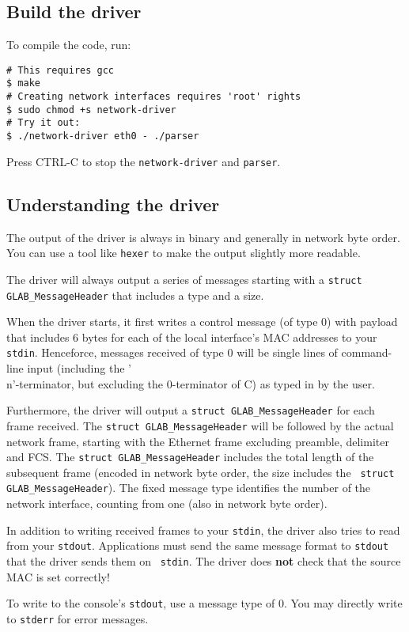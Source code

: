 \subsection{Build the driver}

To compile the code, run:
\begin{verbatim}
# This requires gcc
$ make
# Creating network interfaces requires 'root' rights
$ sudo chmod +s network-driver
# Try it out:
$ ./network-driver eth0 - ./parser
\end{verbatim}
Press CTRL-C to stop the {\tt network-driver} and {\tt parser}.


\subsection{Understanding the driver}

The output of the driver is always in binary and generally in network
byte order.  You can use a tool like {\tt hexer} to make the output
slightly more readable.

The driver will always output a series of messages starting with
a {\tt struct GLAB\_MessageHeader} that includes a type and a size.

When the driver starts, it first writes a control message (of type 0)
with payload that includes 6 bytes for each of the local interface's
MAC addresses to your {\tt stdin}.  Henceforce, messages received
of type 0 will be single lines of command-line input (including the
'\\n'-terminator, but excluding the 0-terminator of C) as typed in
by the user.

Furthermore, the driver will output a {\tt struct GLAB\_MessageHeader}
for each frame received.  The {\tt struct GLAB\_MessageHeader} will be
followed by the actual network frame, starting with the Ethernet frame
excluding preamble, delimiter and FCS.  The {\tt struct
  GLAB\_MessageHeader} includes the total length of the subsequent
frame (encoded in network byte order, the size includes the {\tt
  struct GLAB\_MessageHeader}).  The fixed message type identifies the
number of the network interface, counting from one (also in network
byte order).

In addition to writing received frames to your {\tt stdin}, the driver
also tries to read from your {\tt stdout}.  Applications must send the
same message format to {\tt stdout} that the driver sends them on {\tt
  stdin}.  The driver does {\bf not} check that the source MAC is set
correctly!

To write to the console's {\tt stdout}, use a message type of 0.
You may directly write to {\tt stderr} for error messages.
